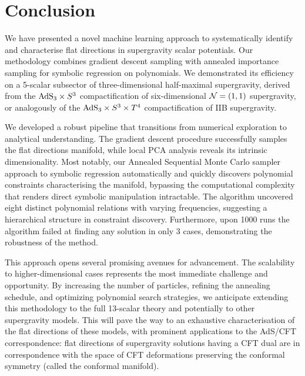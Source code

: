 \documentclass[11pt,a4paper]{article}
\begin{document}
\section{Conclusion} \label{sec:ccl}
We have presented a novel machine learning approach to systematically identify and characterise flat directions in supergravity scalar potentials. Our methodology combines gradient descent sampling with annealed importance sampling for symbolic regression on polynomials. We demonstrated its efficiency on a 5-scalar subsector of three-dimensional half-maximal supergravity, derived from the ${\rm AdS}_3 \times S^3$ compactification of six-dimensional ${\cal N}=(1,1)$ supergravity, or analogously of the ${\rm AdS}_3 \times S^3 \times T^4$ compactification of IIB supergravity.

We developed a robust pipeline that transitions from numerical exploration to analytical understanding. The gradient descent procedure successfully samples the flat directions manifold, while local PCA analysis reveals its intrinsic dimensionality. Most notably, our Annealed Sequential Monte Carlo sampler approach to symbolic regression automatically and quickly discovers polynomial constraints characterising the manifold, bypassing the computational complexity that renders direct symbolic manipulation intractable. The algorithm uncovered eight distinct polynomial relations with varying frequencies, suggesting a hierarchical structure in constraint discovery. Furthermore, upon 1000 runs the algorithm failed at finding any solution in only 3 cases, demonstrating the robustness of the method. 

This approach opens several promising avenues for advancement. The scalability to higher-dimensional cases represents the most immediate challenge and opportunity. By increasing the number of particles, refining the annealing schedule, and optimizing polynomial search strategies, we anticipate extending this methodology to the full 13-scalar theory and potentially to other supergravity models. This will pave the way to an exhaustive characterisation of the flat directions of these models, with prominent applications to the AdS/CFT correspondence: flat directions of supergravity solutions having a CFT dual are in correspondence with the space of CFT deformations preserving the conformal symmetry (called the conformal manifold). 

\end{document}
